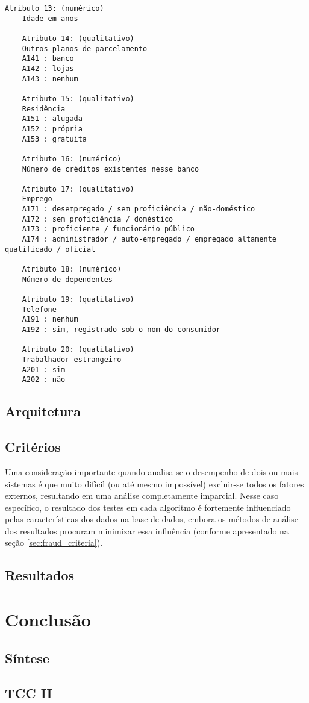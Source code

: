 \begin{lstlisting}[caption=Atributos do primeiro dataset,label=lst:german_dataset]
    Atributo 13: (numérico)
    Idade em anos

    Atributo 14: (qualitativo)
    Outros planos de parcelamento
    A141 : banco
    A142 : lojas
    A143 : nenhum

    Atributo 15: (qualitativo)
    Residência
    A151 : alugada
    A152 : própria
    A153 : gratuita

    Atributo 16: (numérico)
    Número de créditos existentes nesse banco

    Atributo 17: (qualitativo)
    Emprego
    A171 : desempregado / sem proficiência / não-doméstico
    A172 : sem proficiência / doméstico
    A173 : proficiente / funcionário público
    A174 : administrador / auto-empregado / empregado altamente qualificado / oficial

    Atributo 18: (numérico)
    Número de dependentes

    Atributo 19: (qualitativo)
    Telefone
    A191 : nenhum
    A192 : sim, registrado sob o nom do consumidor

    Atributo 20: (qualitativo)
    Trabalhador estrangeiro
    A201 : sim
    A202 : não
\end{lstlisting}

\section{Arquitetura}

\section{Critérios}

Uma consideração importante quando analisa-se o desempenho de dois ou mais sistemas é que muito difícil (ou até mesmo impossível) excluir-se todos os fatores externos, resultando em uma análise completamente imparcial. Nesse caso específico, o resultado dos testes em cada algoritmo é fortemente influenciado pelas características dos dados na base de dados, embora os métodos de análise dos resultados procuram minimizar essa influência (conforme apresentado na seção \ref{sec:fraud_criteria}).

\section{Resultados}

\chapter{Conclusão}

\section{Síntese}

\section{TCC II}
